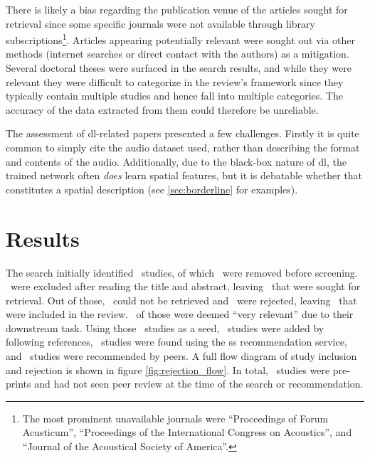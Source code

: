 \documentclass[referee,pdflatex,sn-mathphys-num]{sn-jnl}%
\newcommand{\q}[1]{\enquote{#1}}
\begin{document}
There is likely a bias regarding the publication venue of the articles sought for retrieval since some specific journals were not available through library subscriptions\footnote{The most prominent unavailable journals were \q{Proceedings of Forum Acusticum}, \q{Proceedings of the International Congress on Acoustics}, and \q{Journal of the Acoustical Society of America}.}. Articles appearing potentially relevant were sought out via other methods (internet searches or direct contact with the authors) as a mitigation. Several doctoral theses were surfaced in the search results, and while they were relevant they were difficult to categorize in the review's framework since they typically contain multiple studies and hence fall into multiple categories. The accuracy of the data extracted from them could therefore be unreliable.

The assessment of \gls{dl}-related papers presented a few challenges. Firstly it is quite common to simply cite the audio dataset used, rather than describing the format and contents of the audio. Additionally, due to the black-box nature of \gls{dl}, the trained network often \textit{does} learn spatial features, but it is debatable whether that constitutes a spatial description (see \cref{sec:borderline} for examples).


\section{Results}
\label{sec:results}

The search initially identified \nRecordsIdentified~studies, of which \nRecordsRemovedBeforeScreening~were removed before screening. \nRecordsExcluded~were excluded after reading the title and abstract, leaving \nStudiesSoughtForRetrieval~that were sought for retrieval. Out of those, \nStudiesNotRetrieved~could not be retrieved and \nStudiesExcluded~were rejected, leaving \nStudiesIncluded~that were included in the review. \nStudiesIncludedVeryRelevant~of those were deemed \q{very relevant} due to their downstream task. Using those \nStudiesIncluded~studies as a seed, \nFollowedReferences~studies were added by following references, \nRecommendationService~studies were found using the \gls{ss} recommendation service, and \nPeers~studies were recommended by peers. A full flow diagram of study inclusion and rejection is shown in figure \ref{fig:rejection_flow}. In total, \nPreprints~studies were pre-prints and had not seen peer review at the time of the search or recommendation.
\end{document}

